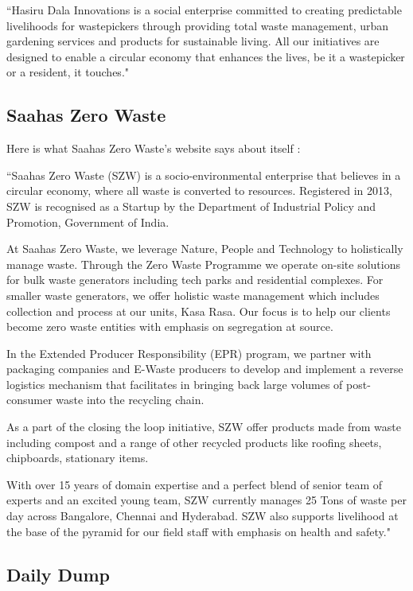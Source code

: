 \documentclass[10pt]{article}
\begin{document}
``Hasiru Dala Innovations is a social enterprise committed to creating predictable livelihoods for wastepickers through providing total waste management, urban gardening services and products for sustainable living. All our initiatives are designed to enable a circular economy that enhances the lives, be it a wastepicker or a resident, it touches."

\subsection{Saahas Zero Waste}

Here is what Saahas Zero Waste's website says about itself \citep{SaahasZeroWaste:about}:

``Saahas Zero Waste (SZW) is a socio-environmental enterprise that believes in a circular economy, where all waste is converted to resources. Registered in 2013, SZW is recognised as a Startup by the Department of Industrial Policy and Promotion, Government of India.

At Saahas Zero Waste, we leverage Nature, People and Technology to holistically manage waste. Through the Zero Waste Programme we operate on-site solutions for bulk waste generators including tech parks and residential complexes. For smaller waste generators, we offer holistic waste management which includes collection and process at our units, Kasa Rasa. Our focus is to help our clients become zero waste entities with emphasis on segregation at source.

In the Extended Producer Responsibility (EPR) program, we partner with packaging companies and E-Waste producers to develop and implement a reverse logistics mechanism that facilitates in bringing back large volumes of post-consumer waste into the recycling chain.

As a part of the closing the loop initiative, SZW offer products made from waste including compost and a range of other recycled products like roofing sheets, chipboards, stationary items.

With over 15 years of domain expertise and a perfect blend of senior team of experts and an excited young team, SZW currently manages 25 Tons of waste per day across Bangalore, Chennai and Hyderabad. SZW also supports livelihood at the base of the pyramid for our field staff with emphasis on health and safety."

\subsection{Daily Dump}
\end{document}
